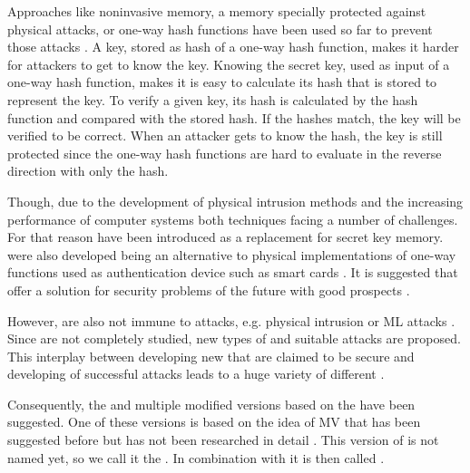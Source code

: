 Approaches like noninvasive memory, a memory specially protected against physical attacks, or one-way hash functions have been used so far to prevent those attacks \cite{Pappu2001PhysicalFunctions}. %
A key, stored as hash of a one-way hash function, makes it harder for attackers to get to know the key. 
Knowing the secret key, used as input of a one-way hash function, makes it is easy to calculate its hash that is stored to represent the key.
To verify a given key, its hash is calculated by the hash function and compared with the stored hash.
If the hashes match, the key will be verified to be correct.
When an attacker gets to know the hash, the key is still protected since the one-way hash functions are hard to evaluate in the reverse direction with only the hash. %

Though, due to the development of physical intrusion methods and the increasing performance of computer systems both techniques facing a number of challenges.
For that reason \pufs have been introduced as a replacement for secret key memory.
\pufs were also developed being an alternative to physical implementations of one-way functions used as authentication device such as smart cards \cite{Pappu2001PhysicalFunctions}.
It is suggested that \pufs offer a solution for security problems of the future with good prospects \cite{Tajik2014PhysicalPUFs}.


However, \pufs are also not immune to attacks, e.g. physical intrusion or \acl{ML} attacks \cite{Tajik2014PhysicalPUFs,Ruhrmair2010ModelingFunctions,Becker2015ThePUFs,Helfmeier2014PhysicalFunctions}.
Since \pufs are not completely studied, new types of \pufs and suitable attacks are proposed. %
This interplay between developing new \pufs that are claimed to be secure and developing of successful attacks leads to a huge variety of different \pufs \cite{Ruhrmair2014PUFOverview}.

Consequently, the \apuf and multiple modified versions based on the \apuf have been suggested. %
One of these versions is based on the idea of \ac{MV} that has been suggested before but has not been researched in detail \cite{Ruhrmair2013PUFData}.
This version of \apufs is not named yet, so we call it the \mpuf.
In combination with \xpufs it is then called \mxpufs.

